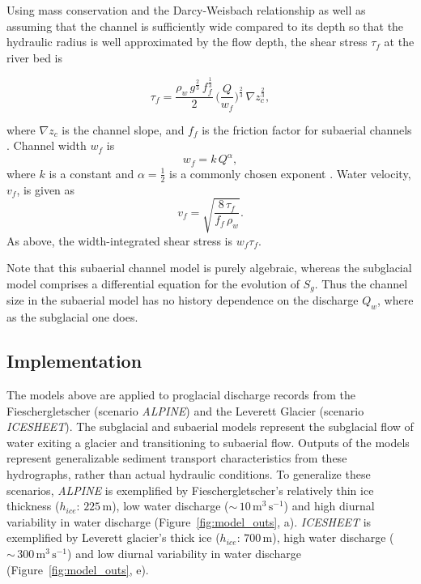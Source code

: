 \documentclass[draft]{agujournal2019}
\newcommand{\alpine}{\textit{ALPINE}}
\newcommand{\icesheet}{\textit{ICESHEET}}
\newcommand{\unit}[1]{$\mathrm{#1}$}
\begin{document}
Using mass conservation and the Darcy-Weisbach relationship as well as assuming that the channel is sufficiently wide compared to its depth so that the hydraulic radius is well approximated by the flow depth,
the shear stress $\tau_f$ at the river bed is
\begin{linenomath*}
  \begin{equation}
    \label{eq:DW_tau}
    \tau_f=\frac{\rho_w\,g^{\frac{2}{3}}\,f_f^{\frac{1}{3}}}{2}\, \Big(\frac{Q}{w_f} \Big)^{\frac{2}{3}} \,\nabla z_c^{\frac{2}{3}},
  \end{equation}
\end{linenomath*}
where $\nabla z_c$ is the channel slope, and $f_f$ is the friction factor for subaerial channels \cite{tucker1997}.
Channel width $w_f$ is
\begin{equation}
  \label{eq:wcf}
  w_f = k \, Q^{\alpha},
\end{equation}
%
where $k$ is a constant and $\alpha=\frac{1}{2}$ is a commonly chosen exponent \cite{leopold1953}.
Water velocity, $v_f$, is given as
\begin{equation}
  \label{eq:vf}
  v_f = \sqrt{\frac{8\,\tau_f}{f_f\,\rho_w}}.
\end{equation}
%
As above, the width-integrated shear stress is $w_f\tau_f$.

Note that this subaerial channel model is purely algebraic, whereas the subglacial model comprises a differential equation for the evolution of $S_g$.
Thus the channel size in the subaerial model has no history dependence on the discharge $Q_w$, where as the subglacial one does.

\subsection{Implementation}
\label{sect:imp}

The models above are applied to proglacial discharge records from the Fieschergletscher (scenario \alpine{}) and the Leverett Glacier (scenario \icesheet{}).
The subglacial and subaerial models represent the subglacial flow of water exiting a glacier and transitioning to subaerial flow.
Outputs of the models represent generalizable sediment transport characteristics from these hydrographs, rather than actual hydraulic conditions.
To generalize these scenarios, \alpine{}  is exemplified by Fieschergletscher's relatively thin ice thickness ($h_{ice}$: $225$\,\unit{m}), low water discharge ($\sim\,10$\,\unit{m}$^3$\,\unit{s}$^{-1}$) and high diurnal variability in water discharge (Figure~\ref{fig:model_outs}, a).
\icesheet{}  is exemplified by Leverett glacier's  thick ice  ($h_{ice}$: $700$\,\unit{m}), high water discharge ($\sim\,300$\,\unit{m}$^3$\,\unit{s}$^{-1}$)  and low diurnal variability in water discharge (Figure~\ref{fig:model_outs}, e).
\end{document}

